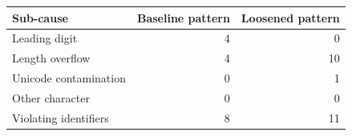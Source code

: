 \begin{tabular}{@{}lrr@{}}
\toprule
Sub-cause & Baseline pattern & Loosened pattern \\
\midrule
Leading digit & 4 & 0 \\
Length overflow & 4 & 10 \\
Unicode contamination & 0 & 1 \\
Other character & 0 & 0 \\
\midrule
Violating identifiers & 8 & 11 \\
\bottomrule
\end{tabular}
